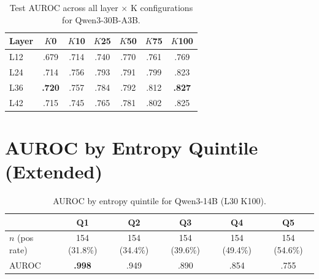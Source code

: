 \documentclass[11pt]{article}
\begin{document}
\begin{table}[H]
\caption{Test AUROC across all layer $\times$ K configurations for Qwen3-30B-A3B.}
\label{tab:app_probes_qwenmoe}
\begin{center}
\begin{small}
\begin{sc}
\begin{tabular}{lcccccc}
\toprule
Layer & $K$0 & $K$10 & $K$25 & $K$50 & $K$75 & $K$100 \\
\midrule
L12 & .679 & .714 & .740 & .770 & .761 & .769 \\
L24 & .714 & .756 & .793 & .791 & .799 & .823 \\
L36 & \textbf{.720} & .757 & .784 & .792 & .812 & \textbf{.827} \\
L42 & .715 & .745 & .765 & .781 & .802 & .825 \\
\bottomrule
\end{tabular}
\end{sc}
\end{small}
\end{center}
\end{table}


\section{AUROC by Entropy Quintile (Extended)}
\label{app:quintiles}

\begin{table}[H]
\caption{AUROC by entropy quintile for Qwen3-14B (L30 K100).}
\label{tab:app_quintiles_qwen}
\begin{center}
\begin{small}
\begin{sc}
\begin{tabular}{lccccc}
\toprule
 & Q1 & Q2 & Q3 & Q4 & Q5 \\
\midrule
$n$ (pos rate) & 154 (31.8\%) & 154 (34.4\%) & 154 (39.6\%) & 154 (49.4\%) & 154 (54.6\%) \\
AUROC & \textbf{.998} & .949 & .890 & .854 & .755 \\
\bottomrule
\end{tabular}
\end{sc}
\end{small}
\end{center}
\end{table}
\end{document}
